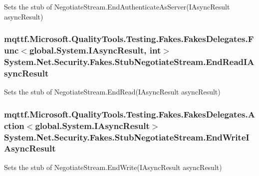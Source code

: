 Sets the stub of Negotiate\-Stream.\-End\-Authenticate\-As\-Server(\-I\-Async\-Result async\-Result)

\hypertarget{class_system_1_1_net_1_1_security_1_1_fakes_1_1_stub_negotiate_stream_a0c894bc836548d20de2d44f1838a87e0}{
\subsubsection[{End\-Read\-I\-Async\-Result}]{\setlength{\rightskip}{0pt plus 5cm}mqttf.\-Microsoft.\-Quality\-Tools.\-Testing.\-Fakes.\-Fakes\-Delegates.\-Func$<$global.\-System.\-I\-Async\-Result, int$>$ System.\-Net.\-Security.\-Fakes.\-Stub\-Negotiate\-Stream.\-End\-Read\-I\-Async\-Result}}\label{class_system_1_1_net_1_1_security_1_1_fakes_1_1_stub_negotiate_stream_a0c894bc836548d20de2d44f1838a87e0}


Sets the stub of Negotiate\-Stream.\-End\-Read(\-I\-Async\-Result async\-Result)

\hypertarget{class_system_1_1_net_1_1_security_1_1_fakes_1_1_stub_negotiate_stream_aaec3dd8627fbbdbf1ac9f92e53ea5a82}{
\subsubsection[{End\-Write\-I\-Async\-Result}]{\setlength{\rightskip}{0pt plus 5cm}mqttf.\-Microsoft.\-Quality\-Tools.\-Testing.\-Fakes.\-Fakes\-Delegates.\-Action$<$global.\-System.\-I\-Async\-Result$>$ System.\-Net.\-Security.\-Fakes.\-Stub\-Negotiate\-Stream.\-End\-Write\-I\-Async\-Result}}\label{class_system_1_1_net_1_1_security_1_1_fakes_1_1_stub_negotiate_stream_aaec3dd8627fbbdbf1ac9f92e53ea5a82}


Sets the stub of Negotiate\-Stream.\-End\-Write(\-I\-Async\-Result async\-Result)


